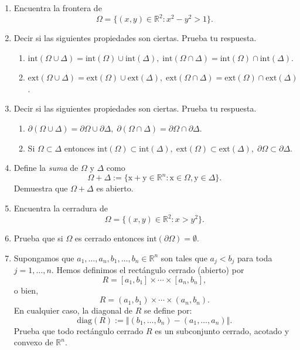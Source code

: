 \documentclass[12pt]{article}
\newcommand{\norm}[1]{\left\Vert#1\right\Vert}
\newcommand{\diag}{\mathrm{diag}}
\newcommand{\Ext}{\mathrm{ext}}
\newcommand{\Int}{\mathrm{int}}
\newcommand{\R}{\mathbb R}
\newcommand{\x}{\mathrm x}
\newcommand{\y}{\mathrm y}
\begin{document}
\begin{enumerate}
\item Encuentra la frontera de 
\[ \Omega = \{ (x,y)\in \R^2 : x^2 - y^2 > 1 \}. \]

\item Decir si las siguientes propiedades son ciertas. Prueba tu respuesta.
\begin{enumerate}[(1)]
\item $\Int(\Omega\cup \Delta) = \Int(\Omega)\cup \Int(\Delta),\; \Int(\Omega\cap \Delta) = \Int(\Omega)\cap \Int(\Delta)$.
\item $\Ext(\Omega\cup \Delta) = \Ext(\Omega)\cup \Ext(\Delta),\; \Ext(\Omega\cap \Delta) = \Ext(\Omega)\cap \Ext(\Delta)$.
\end{enumerate}

\item Decir si las siguientes propiedades son ciertas. Prueba tu respuesta.
\begin{enumerate}[(1)]
\item $\partial(\Omega\cup \Delta) = \partial \Omega\cup \partial \Delta,\; 
\partial(\Omega\cap \Delta) = \partial \Omega\cap \partial \Delta$.
\item Si $\Omega\subset \Delta$ entonces $\Int(\Omega)\subset \Int(\Delta),\; \Ext(\Omega)\subset \Ext(\Delta),\; \partial \Omega\subset \partial \Delta$.
\end{enumerate}

\item Define la \emph{suma} de $\Omega$ y $\Delta$ como
\[ \Omega + \Delta := \{ \x+\y\in \R^n : \x\in \Omega, \y\in \Delta \}. \]
Demuestra que $\Omega + \Delta$ es abierto.

\item Encuentra la cerradura de 
\[ \Omega = \{ (x,y)\in \R^2 : x > y^2 \}. \]

\item Prueba que si $\Omega$ es cerrado entonces 
$\Int(\partial \Omega)=\emptyset$.

\item Supongamos que $a_1,\ldots,a_n,b_1,\ldots,b_n\in \R^n$ son tales que $a_j<b_j$ para toda $j=1,\ldots,n$. Hemos definimos el rectángulo cerrado (abierto) por
\[ R = [a_1,b_1]\times \cdots\times [a_n,b_n], \]
o bien,
\[ R = (a_1,b_1)\times \cdots\times (a_n,b_n). \]
En cualquier caso, la \textsf{diagonal} de $R$ se define por:
\[ \diag(R) := \norm{(b_1,\ldots,b_n) - (a_1,\ldots,a_n)}. \]
Prueba que todo rectángulo cerrado $R$ es un subconjunto cerrado, acotado y convexo de $\R^n$. 

\end{enumerate}
\end{document}
